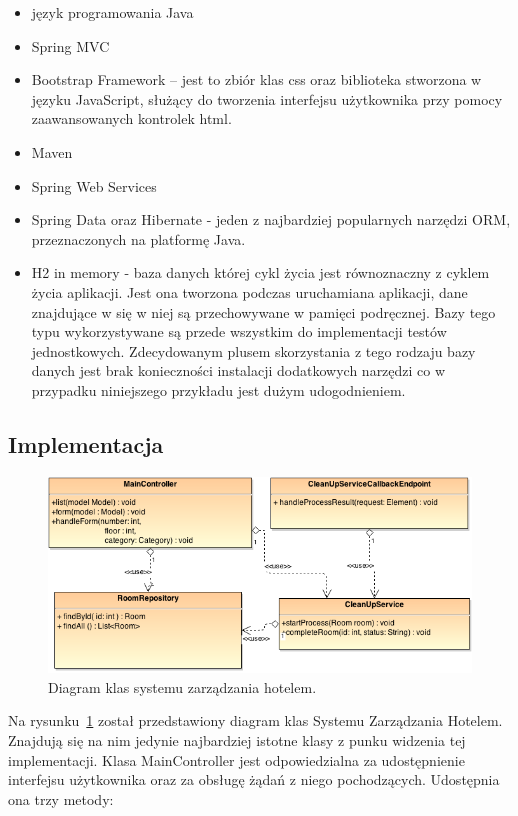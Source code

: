 \begin{itemize}
\item język programowania Java
\item Spring MVC
\item  Bootstrap Framework -- jest to zbiór  klas css oraz biblioteka stworzona w języku JavaScript, służący do tworzenia interfejsu użytkownika przy pomocy zaawansowanych kontrolek html.
\item Maven
\item Spring Web Services
\item Spring Data oraz Hibernate - jeden z najbardziej popularnych narzędzi ORM, przeznaczonych na platformę Java. 
\item H2 in memory - baza danych której cykl życia jest równoznaczny z cyklem życia aplikacji. Jest ona tworzona podczas uruchamiana aplikacji, dane znajdujące w się w niej są przechowywane w pamięci podręcznej. Bazy tego typu wykorzystywane są przede wszystkim do implementacji testów jednostkowych. Zdecydowanym plusem skorzystania z tego rodzaju bazy danych jest brak konieczności instalacji dodatkowych narzędzi co w przypadku niniejszego przykładu jest dużym udogodnieniem. 
\end{itemize}

\subsection{Implementacja}

\begin{figure}[h]
\centerline{\includegraphics[scale=0.6]{hotelManagementSystemClasses}}
\caption{Diagram klas systemu zarządzania hotelem.}
\label{fig:hotelManagementSystemClasses}
\end{figure}


Na rysunku~\ref{fig:hotelManagementSystemClasses} został przedstawiony diagram klas Systemu Zarządzania Hotelem. Znajdują się na nim jedynie najbardziej istotne klasy z punku widzenia tej implementacji. Klasa MainController jest odpowiedzialna za udostępnienie interfejsu użytkownika oraz za obsługę żądań z niego pochodzących. Udostępnia ona trzy metody: 


